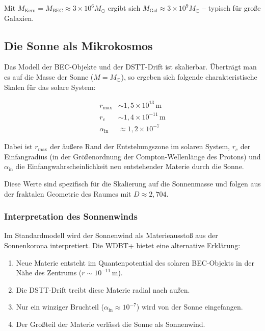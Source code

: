 Mit \( M_{\text{Kern}} = M_{\text{BEC}} \approx 3 \times 10^6 M_\odot \) ergibt sich \( M_{\text{Gal}} \approx 3 \times 10^9 M_\odot \) – typisch für große Galaxien.

\subsection{Die Sonne als Mikrokosmos}
\label{sub:kosmo_sonne}

Das Modell der BEC-Objekte und der DSTT-Drift ist skalierbar. 
Überträgt man es auf die Masse der Sonne (\( M = M_{\odot} \)), 
so ergeben sich folgende charakteristische Skalen für das solare System:

\begin{align}
r_{\text{max}} &\sim 1,5 \times 10^{13} \, \text{m} \tag{14.20} \\
r_c &\sim 1,4 \times 10^{-11} \, \text{m} \tag{14.21} \\
\alpha_{\text{in}} &\approx 1,2 \times 10^{-7} \tag{14.22}
\end{align}

Dabei ist \( r_{\text{max}} \) der äußere Rand der Entstehungszone im solaren System, 
\( r_c \) der Einfangradius (in der Größenordnung der 
Compton-Wellenlänge des Protons) und \( \alpha_{\text{in}} \) die 
Einfangwahrscheinlichkeit neu entstehender Materie durch die Sonne.

Diese Werte sind spezifisch für die Skalierung auf die Sonnenmasse und folgen aus der fraktalen Geometrie des Raumes mit \( D \approx 2,704 \).

\subsubsection{Interpretation des Sonnenwinds}
\label{sub:kosmo_sonnenwind}

Im Standardmodell wird der Sonnenwind als Materieausstoß aus der 
Sonnenkorona interpretiert. Die WDBT+ bietet eine alternative 
Erklärung:

\begin{enumerate}
    \item Neue Materie entsteht im Quantenpotential des solaren 
          BEC-Objekts in der Nähe des Zentrums (\( r \sim 10^{-11} \, \text{m} \)).
    \item Die DSTT-Drift treibt diese Materie radial nach außen.
    \item Nur ein winziger Bruchteil (\( \alpha_{\text{in}} \approx 10^{-7} \)) 
          wird von der Sonne eingefangen.
    \item Der Großteil der Materie verlässt die Sonne als Sonnenwind.
\end{enumerate}

